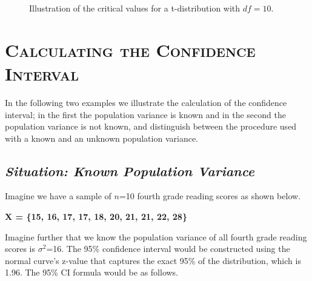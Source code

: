 \documentclass[12pt]{article}
\begin{document}
\begin{figure}[ht]
\centering
{}
\caption{Illustration of the critical values for a t-distribution with $df = 10$.}
\label{fig:5.4}
\end{figure}

\newpage


\section*{\textsc{Calculating the Confidence Interval}}

In the following two examples we illustrate the calculation of the confidence interval; in the first the population variance is known and in the second the population variance is not known, and distinguish between the procedure used with a known and an unknown population variance.

\subsection*{\textit{Situation: Known Population Variance}}

\hspace{1em} Imagine we have a sample of $n$=10 fourth grade reading scores as shown below.

\begin{center}
\textbf{X = \{15, 16, 17, 17, 18, 20, 21, 21, 22, 28\}}
\end{center}

Imagine further that we know the population variance of all fourth grade reading scores is $\sigma^2$=16. The 95\% confidence interval would be constructed using the normal curve's z-value that captures the exact 95\% of the distribution, which is 1.96. The 95\% CI formula would be as follows.
\end{document}
